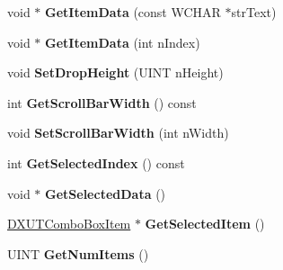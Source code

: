 \begin{DoxyCompactItemize}
\item 
\hypertarget{class_c_d_x_u_t_combo_box_a25cd3ea3c6094505c29ca6bf2c90d4af}{void $\ast$ {\bfseries Get\+Item\+Data} (const W\+C\+H\+A\+R $\ast$str\+Text)}\label{class_c_d_x_u_t_combo_box_a25cd3ea3c6094505c29ca6bf2c90d4af}

\item 
\hypertarget{class_c_d_x_u_t_combo_box_a93938cc0dcad77883818800ff4c68e5e}{void $\ast$ {\bfseries Get\+Item\+Data} (int n\+Index)}\label{class_c_d_x_u_t_combo_box_a93938cc0dcad77883818800ff4c68e5e}

\item 
\hypertarget{class_c_d_x_u_t_combo_box_a1ace87e91be7ab78d7367e99f1788952}{void {\bfseries Set\+Drop\+Height} (U\+I\+N\+T n\+Height)}\label{class_c_d_x_u_t_combo_box_a1ace87e91be7ab78d7367e99f1788952}

\item 
\hypertarget{class_c_d_x_u_t_combo_box_a47644eab0287801bf65a37fe9c03989b}{int {\bfseries Get\+Scroll\+Bar\+Width} () const }\label{class_c_d_x_u_t_combo_box_a47644eab0287801bf65a37fe9c03989b}

\item 
\hypertarget{class_c_d_x_u_t_combo_box_a88c5c2c892f239357443fc6b3b37c40d}{void {\bfseries Set\+Scroll\+Bar\+Width} (int n\+Width)}\label{class_c_d_x_u_t_combo_box_a88c5c2c892f239357443fc6b3b37c40d}

\item 
\hypertarget{class_c_d_x_u_t_combo_box_a9aebfa06b0ce036107cacd687d65bde4}{int {\bfseries Get\+Selected\+Index} () const }\label{class_c_d_x_u_t_combo_box_a9aebfa06b0ce036107cacd687d65bde4}

\item 
\hypertarget{class_c_d_x_u_t_combo_box_abaf5f86c0e1f652aa1f71a8cbc63122a}{void $\ast$ {\bfseries Get\+Selected\+Data} ()}\label{class_c_d_x_u_t_combo_box_abaf5f86c0e1f652aa1f71a8cbc63122a}

\item 
\hypertarget{class_c_d_x_u_t_combo_box_a99d3048050a0e6934ecc6140d350f222}{\hyperlink{struct_d_x_u_t_combo_box_item}{D\+X\+U\+T\+Combo\+Box\+Item} $\ast$ {\bfseries Get\+Selected\+Item} ()}\label{class_c_d_x_u_t_combo_box_a99d3048050a0e6934ecc6140d350f222}

\item 
\hypertarget{class_c_d_x_u_t_combo_box_a4706b4e1da4030d3107b76885a27e3e9}{U\+I\+N\+T {\bfseries Get\+Num\+Items} ()}\label{class_c_d_x_u_t_combo_box_a4706b4e1da4030d3107b76885a27e3e9}


\end{DoxyCompactItemize}

